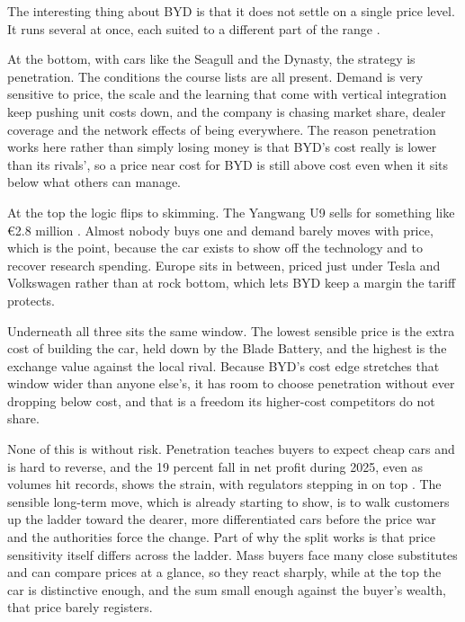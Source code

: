 
The interesting thing about BYD is that it does not settle on a single price level. It runs several at once, each suited to a different part of the range \cite{nagle2018}.

At the bottom, with cars like the Seagull and the Dynasty, the strategy is penetration. The conditions the course lists are all present. Demand is very sensitive to price, the scale and the learning that come with vertical integration keep pushing unit costs down, and the company is chasing market share, dealer coverage and the network effects of being everywhere. The reason penetration works here rather than simply losing money is that BYD's cost really is lower than its rivals', so a price near cost for BYD is still above cost even when it sits below what others can manage.

At the top the logic flips to skimming. The Yangwang U9 sells for something like \euro2.8 million \cite{electrekU9}. Almost nobody buys one and demand barely moves with price, which is the point, because the car exists to show off the technology and to recover research spending. Europe sits in between, priced just under Tesla and Volkswagen rather than at rock bottom, which lets BYD keep a margin the tariff protects.

Underneath all three sits the same window. The lowest sensible price is the extra cost of building the car, held down by the Blade Battery, and the highest is the exchange value against the local rival. Because BYD's cost edge stretches that window wider than anyone else's, it has room to choose penetration without ever dropping below cost, and that is a freedom its higher-cost competitors do not share.

None of this is without risk. Penetration teaches buyers to expect cheap cars and is hard to reverse, and the 19 percent fall in net profit during 2025, even as volumes hit records, shows the strain, with regulators stepping in on top \cite{byd2025}. The sensible long-term move, which is already starting to show, is to walk customers up the ladder toward the dearer, more differentiated cars before the price war and the authorities force the change. Part of why the split works is that price sensitivity itself differs across the ladder. Mass buyers face many close substitutes and can compare prices at a glance, so they react sharply, while at the top the car is distinctive enough, and the sum small enough against the buyer's wealth, that price barely registers.
